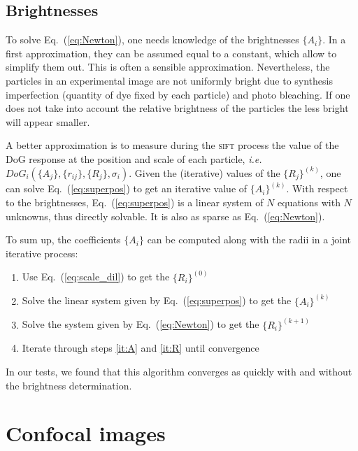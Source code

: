 \documentclass[8.5pt,twoside,twocolumn]{article}
\begin{document}
\subsection*{Brightnesses}

To solve Eq.~(\ref{eq:Newton}), one needs knowledge of the brightnesses $\lbrace A_i\rbrace$. In a first approximation, they can be assumed equal to a constant, which allow to simplify them out. This is often a sensible approximation. Nevertheless, the particles in an experimental image are not uniformly bright due to synthesis imperfection (quantity of dye fixed by each particle) and photo bleaching. If one does not take into account the relative brightness of the particles the less bright will appear smaller.

A better approximation is to measure during the \textsc{sift} process the value of the DoG response at the position and scale of each particle, \emph{i.e.} $DoG_i(\lbrace A_j\rbrace, \lbrace r_{ij}\rbrace, \lbrace R_j\rbrace, \sigma_i)$. Given the (iterative) values of the $\lbrace R_j\rbrace^{(k)}$, one can solve Eq.~(\ref{eq:superpos}) to get an iterative value of $\lbrace A_i\rbrace^{(k)}$. With respect to the brightnesses, Eq.~(\ref{eq:superpos}) is a linear system of $N$ equations with $N$ unknowns, thus directly solvable. It is also as sparse as Eq.~(\ref{eq:Newton}).

To sum up, the coefficients $\lbrace A_i\rbrace$ can be computed along with the radii in a joint iterative process:
\begin{enumerate}
\item Use Eq.~(\ref{eq:scale_dil}) to get the $\lbrace R_i\rbrace^{(0)}$
\item Solve the linear system given by Eq.~(\ref{eq:superpos}) to get the $\lbrace A_i\rbrace^{(k)}$ \label{it:A}
\item Solve the system given by Eq.~(\ref{eq:Newton}) to get the $\lbrace R_i\rbrace^{(k+1)}$ \label{it:R}
\item Iterate through steps \ref{it:A} and \ref{it:R} until convergence
\end{enumerate}


In our tests, we found that this algorithm converges as quickly with and without the brightness determination.

\section*{Confocal images}
\end{document}
